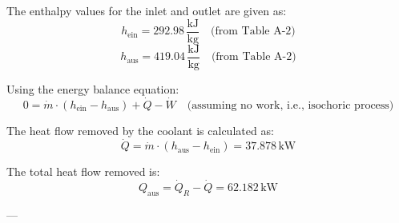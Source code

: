 The enthalpy values for the inlet and outlet are given as:  
\[
h_{\text{ein}} = 292.98 \, \frac{\text{kJ}}{\text{kg}} \quad \text{(from Table A-2)}
\]  
\[
h_{\text{aus}} = 419.04 \, \frac{\text{kJ}}{\text{kg}} \quad \text{(from Table A-2)}
\]  

Using the energy balance equation:  
\[
0 = \dot{m} \cdot (h_{\text{ein}} - h_{\text{aus}}) + \dot{Q} - \dot{W} \quad \text{(assuming no work, i.e., isochoric process)}
\]  

The heat flow removed by the coolant is calculated as:  
\[
\dot{Q} = \dot{m} \cdot (h_{\text{aus}} - h_{\text{ein}}) = 37.878 \, \text{kW}
\]  

The total heat flow removed is:  
\[
Q_{\text{aus}} = \dot{Q}_R - \dot{Q} = 62.182 \, \text{kW}
\]  

---